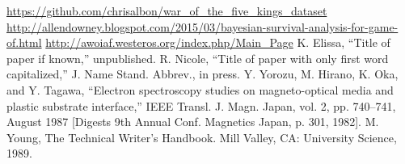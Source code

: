 \documentclass[conference]{IEEEtran}
\begin{document}



\begin{thebibliography}{00}
 \url{https://github.com/chrisalbon/war_of_the_five_kings_dataset}
 \url{http://allendowney.blogspot.com/2015/03/bayesian-survival-analysis-for-game-of.html}
 \url{http://awoiaf.westeros.org/index.php/Main_Page}
 K. Elissa, ``Title of paper if known,'' unpublished.
 R. Nicole, ``Title of paper with only first word capitalized,'' J. Name Stand. Abbrev., in press.
 Y. Yorozu, M. Hirano, K. Oka, and Y. Tagawa, ``Electron spectroscopy studies on magneto-optical media and plastic substrate interface,'' IEEE Transl. J. Magn. Japan, vol. 2, pp. 740--741, August 1987 [Digests 9th Annual Conf. Magnetics Japan, p. 301, 1982].
 M. Young, The Technical Writer's Handbook. Mill Valley, CA: University Science, 1989.
\end{thebibliography}
\end{document}
